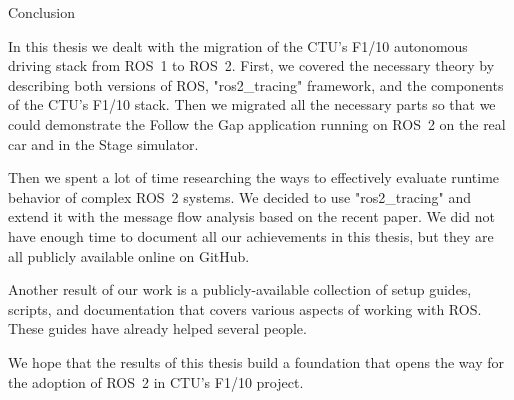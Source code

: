 \chap[conclusion] Conclusion

In this thesis we dealt with the migration of the CTU's F1/10 autonomous driving stack from ROS~1 to ROS~2. First, we covered the necessary theory by describing both versions of ROS, "ros2_tracing" framework, and the components of the CTU's F1/10 stack. Then we migrated all the necessary parts so that we could demonstrate the Follow the Gap application running on ROS~2 on the real car and in the Stage simulator.

Then we spent a lot of time researching the ways to effectively evaluate runtime behavior of complex ROS~2 systems. We decided to use "ros2_tracing" and extend it with the message flow analysis based on the recent paper.
We did not have enough time to document all our achievements in this thesis, but they are all publicly available online on GitHub.

Another result of our work is a publicly-available collection of setup guides, scripts, and documentation that covers various aspects of working with ROS. These guides have already helped several people.

We hope that the results of this thesis build a foundation that opens the way for the adoption of ROS~2 in CTU's F1/10 project.
